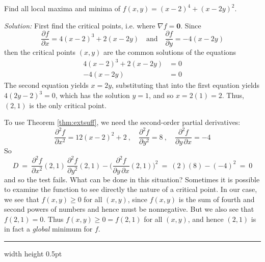 \begin{exmp}\label{exmp:globalmin}
 Find all local maxima and minima of $f(x,y) = (x-2)^4 + (x-2y)^2$.\smallskip
 \par\noindent\emph{Solution:} First find the critical points, i.e. where $\nabla f = \mathbf{0}$. Since
 \begin{displaymath}
  \frac{\partial f}{\partial x} = 4(x-2)^3 + 2(x-2y) \quad \text{and} \quad \frac{\partial f}{\partial y} = -4(x-2y)
 \end{displaymath}
 then the critical points $(x,y)$ are the common solutions of the equations
 \begin{align*}
  4(x-2)^3 + 2(x-2y) &= 0\\
  -4(x-2y) &= 0
 \end{align*}
 The second equation yields $x=2y$, substituting that into the first equation yields $4(2y-2)^3 = 0$, which has
 the solution $y=1$, and so $x =2(1) = 2$. Thus, $(2,1)$ is the only critical point.
 
 To use Theorem \ref{thm:extsuff}, we need the second-order partial derivatives:
 \begin{displaymath}
  \frac{\partial^2 f}{\partial x^2} = 12(x-2)^2 + 2 ~,\quad \frac{\partial^2 f}{\partial y^2} = 8 ~,\quad
  \dfrac{\partial^2 f}{\partial y \, \partial x} = -4
 \end{displaymath}
So
 \begin{displaymath}
  D ~=~ \dfrac{\partial^2 f}{\partial x^2}(2,1) \, \dfrac{\partial^2 f}{\partial y^2}(2,1) -
 \biggl( \dfrac{\partial^2 f}{\partial y \, \partial x}(2,1) \biggr)^2 ~=~ (2)(8) - (-4)^2 ~=~ 0
 \end{displaymath}
 and so the test fails. What can be done in this situation? Sometimes it is possible to examine the function to see
 directly the nature of a critical point. In our case, we see that $f(x,y) \ge 0$ for all $(x,y)$, since $f(x,y)$ is
 the sum of fourth and second powers of numbers and hence must be nonnegative. But we also see that $f(2,1) = 0$.
 Thus $f(x,y) \ge 0 = f(2,1)$ for all $(x,y)$, and hence $(2,1)$ is in fact a \emph{global} minimum for $f$.
\end{exmp}
\hrule width \textwidth height 0.5pt
